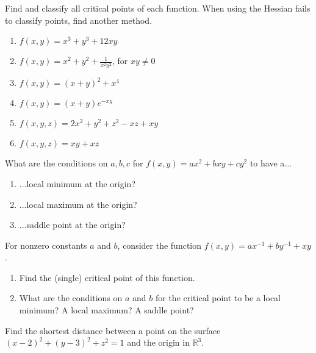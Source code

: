 \documentclass{ximera}
\begin{document}
\begin{problem}
Find and classify all critical points of each function. When using the Hessian fails to classify points, find another method.

\begin{enumerate}

\item $f(x,y) = x^3 + y^3 + 12xy$

\item $f(x,y) = x^2+y^2+\frac{1}{x^2y^2}$, for $xy\neq 0$

\item $f(x,y) = (x+y)^2+x^4$

\item $f(x,y) = (x+y)e^{-xy}$

\item $f(x,y,z) = 2x^2+y^2+z^2-xz+xy$

\item $f(x,y,z) = xy+xz$
\end{enumerate}

\end{problem}

\begin{problem} What are the conditions on $a,b,c$ for $f(x,y) = ax^2+bxy+cy^2$ to have a...\begin{enumerate}
\item ...local minimum at the origin?
\item ...local maximum at the origin?
\item ...saddle point at the origin?
\end{enumerate}
\end{problem}

\begin{problem} For nonzero constants $a$ and $b$, consider the function $f(x,y) = ax^{-1}+by^{-1}+xy$.\begin{enumerate}
\item Find the (single) critical point of this function.
\item What are the conditions on $a$ and $b$ for the critical point to be a local minimum? A local maximum? A saddle point?
\end{enumerate}
\end{problem}

\begin{problem} %
Find the shortest distance between a point on the surface $(x-2)^2+(y-3)^2+z^2=1$ and the origin in $\mathbb{R}^3$.
\end{problem}
\end{document}
